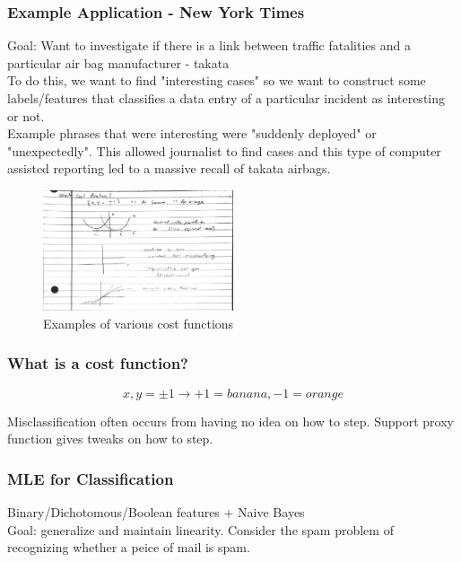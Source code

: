 \subsubsection{Example Application - New York Times}

Goal: Want to investigate if there is a link between traffic fatalities and a particular air bag manufacturer - takata\\

To do this, we want to find "interesting cases" so we want to construct some labels/features that classifies a data entry of a particular incident as interesting or not.\\

Example phrases that were interesting were "suddenly deployed" or "unexpectedly". This allowed journalist to find cases and this type of computer assisted reporting led to a massive recall of takata airbags.

\begin{figure}[ht]
  \begin{center}
    \includegraphics[width=0.5\textwidth]{figures/CostFunctions.png}
    \caption{
      Examples of various cost functions}
    \label{Figure 2}
  \end{center}
\end{figure}

\subsubsection{What is a cost function?}

$${x, y = \pm1} \rightarrow +1 = banana, -1=orange$$

Misclassification often occurs from having no idea on how to step. Support proxy function gives tweaks on how to step. 

\subsubsection{MLE for Classification\\}

Binary/Dichotomous/Boolean features + Naive Bayes\\
Goal: generalize and maintain linearity. Consider the spam problem of recognizing whether a peice of mail is spam.

